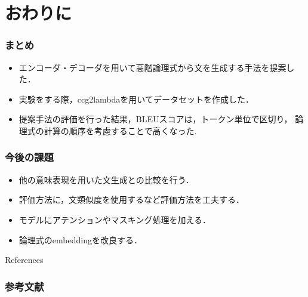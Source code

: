 \documentclass[dvipdfmx]{beamer}
\begin{document}
\section{おわりに}
\begin{frame}
\frametitle{まとめ}
\begin{itemize}
\item エンコーダ・デコーダを用いて高階論理式から文を生成する手法を提案した．
\item 実験をする際，ccg2lambdaを用いてデータセットを作成した．
\item 提案手法の評価を行った結果，BLEUスコアは，トークン単位で区切り，
論理式の計算の順序を考慮することで高くなった.
\end{itemize}

\end{frame}

\begin{frame}
\frametitle{今後の課題}
\begin{itemize}
\item 他の意味表現を用いた文生成との比較を行う．
\item 評価方法に，文類似度を使用するなど評価方法を工夫する．
\item モデルにアテンションやマスキング処理を加える．
\item 論理式のembeddingを改良する．
\end{itemize}

\end{frame}


\begin{frame}[allowframebreaks]{References}{} %
\frametitle{参考文献}
\fontsize{9pt}{0pt}\selectfont %


\nocite{*}
\fontsize{12pt}{0pt}\selectfont %
\end{frame}


\end{document}
